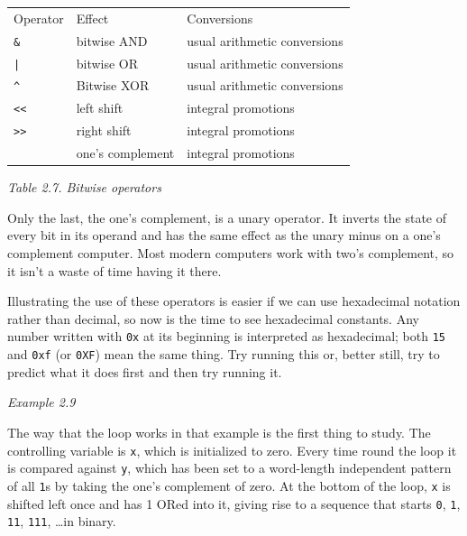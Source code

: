     \begin{tabular}{llp{\textwidth}}
      Operator & Effect & Conversions
     \\

      \texttt{\&} & bitwise AND & usual arithmetic conversions
     \\

      \texttt{|} & bitwise OR & usual arithmetic conversions
     \\

      \texttt{\^} & Bitwise XOR & usual arithmetic conversions
     \\

      \texttt{<<} & left shift & integral promotions
     \\

      \texttt{>>} & right shift & integral promotions
     \\

      \texttt{~} & one's complement & integral promotions
     \\
\end{tabular}

\begin{center}\textit{Table 2.7. Bitwise operators}\end{center}


    Only the last, the one's complement, is a unary operator. It inverts
     the state of every bit in its operand and has the same effect as the
     unary minus on a one's complement computer. Most modern computers work
     with two's complement, so it isn't a waste of time having it there.


    Illustrating the use of these operators is easier if we can use
     hexadecimal notation rather than decimal, so now is the time to see
     hexadecimal constants. Any number written with \texttt{0x} at
     its beginning is interpreted as hexadecimal; both \texttt{15}
     and \texttt{0xf} (or \texttt{0XF}) mean the same thing.
     Try running this or, better still, try to predict what it does first and
     then try running it.


    \begin{center}\textit{Example 2.9}\end{center}


    The way that the loop works in that example is the first thing to
     study. The controlling variable is \texttt{x}, which is
     initialized to zero. Every time round the loop it is compared
     against \texttt{y}, which has been set to a word-length
     independent pattern of all \texttt{1}s by taking the one's
     complement of zero. At the bottom of the loop, \texttt{x} is
     shifted left once and has 1 ORed into it, giving rise to a sequence
     that starts \texttt{0}, \texttt{1}, \texttt{11},
     \texttt{111}, \ldots  in binary.


